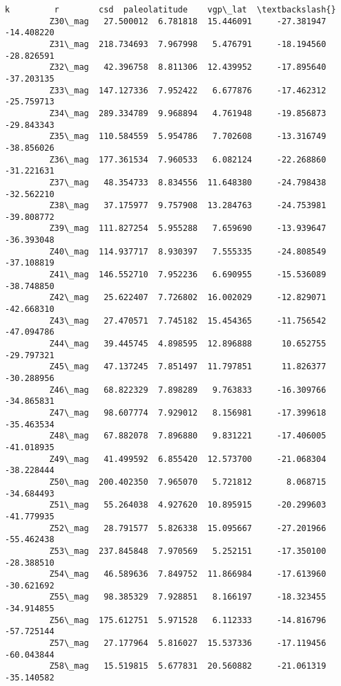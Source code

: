 \documentclass[11pt]{article}
\begin{document}
\begin{Verbatim}[commandchars=\\\{\}]
                           k         r        csd  paleolatitude    vgp\_lat  \textbackslash{}
         Z30\_mag   27.500012  6.781818  15.446091     -27.381947 -14.408220   
         Z31\_mag  218.734693  7.967998   5.476791     -18.194560 -28.826591   
         Z32\_mag   42.396758  8.811306  12.439952     -17.895640 -37.203135   
         Z33\_mag  147.127336  7.952422   6.677876     -17.462312 -25.759713   
         Z34\_mag  289.334789  9.968894   4.761948     -19.856873 -29.843343   
         Z35\_mag  110.584559  5.954786   7.702608     -13.316749 -38.856026   
         Z36\_mag  177.361534  7.960533   6.082124     -22.268860 -31.221631   
         Z37\_mag   48.354733  8.834556  11.648380     -24.798438 -32.562210   
         Z38\_mag   37.175977  9.757908  13.284763     -24.753981 -39.808772   
         Z39\_mag  111.827254  5.955288   7.659690     -13.939647 -36.393048   
         Z40\_mag  114.937717  8.930397   7.555335     -24.808549 -37.108819   
         Z41\_mag  146.552710  7.952236   6.690955     -15.536089 -38.748850   
         Z42\_mag   25.622407  7.726802  16.002029     -12.829071 -42.668310   
         Z43\_mag   27.470571  7.745182  15.454365     -11.756542 -47.094786   
         Z44\_mag   39.445745  4.898595  12.896888      10.652755 -29.797321   
         Z45\_mag   47.137245  7.851497  11.797851      11.826377 -30.288956   
         Z46\_mag   68.822329  7.898289   9.763833     -16.309766 -34.865831   
         Z47\_mag   98.607774  7.929012   8.156981     -17.399618 -35.463534   
         Z48\_mag   67.882078  7.896880   9.831221     -17.406005 -41.018935   
         Z49\_mag   41.499592  6.855420  12.573700     -21.068304 -38.228444   
         Z50\_mag  200.402350  7.965070   5.721812       8.068715 -34.684493   
         Z51\_mag   55.264038  4.927620  10.895915     -20.299603 -41.779935   
         Z52\_mag   28.791577  5.826338  15.095667     -27.201966 -55.462438   
         Z53\_mag  237.845848  7.970569   5.252151     -17.350100 -28.388510   
         Z54\_mag   46.589636  7.849752  11.866984     -17.613960 -30.621692   
         Z55\_mag   98.385329  7.928851   8.166197     -18.323455 -34.914855   
         Z56\_mag  175.612751  5.971528   6.112333     -14.816796 -57.725144   
         Z57\_mag   27.177964  5.816027  15.537336     -17.119456 -60.043844   
         Z58\_mag   15.519815  5.677831  20.560882     -21.061319 -35.140582   
         

\end{Verbatim}
\end{document}
